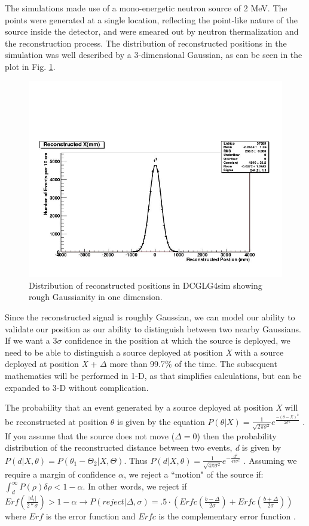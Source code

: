 The simulations made use of a mono-energetic neutron source of 2 MeV. The points were generated at a single location, reflecting the point-like nature of the source inside the detector, and were smeared out by neutron thermalization and the reconstruction process. The distribution of reconstructed positions in the simulation was well described by a 3-dimensional Gaussian, as can be seen in the plot in Fig. \ref{Sim Reco}.

\begin{figure}
\includegraphics[width=\textwidth]{AA/AA_Reconstructed_Positions.jpg}
\caption{Distribution of reconstructed positions in DCGLG4sim showing rough Gaussianity in one dimension.}
\label{Sim Reco}
\end{figure}

Since the reconstructed signal is roughly Gaussian, we can model our ability to validate our position as our ability to distinguish between two nearby Gaussians. If we want a 3$\sigma$ confidence in the position at which the source is deployed, we need to be able to distinguish a source deployed at position \emph{X} with a source deployed at position \emph{X} + $\Delta$ more than 99.7\% of the time. The subsequent mathematics will be performed in 1-D, as that simplifies calculations, but can be expanded to 3-D without complication. 

The probability that an event generated by a source deployed at position \emph{X} will be reconstructed at position $\theta$ is given by the equation $P(\theta | X) =\frac{1}{\sqrt{2 \pi \sigma^2}}e^{\frac{-(\theta - X)^2}{2 \sigma^2}}$ . If you assume that the source does not move ($\Delta =0$) then the probability distribution of the reconstructed distance between two events, \emph{d} is given by $P(d | X, \theta) = P(\theta_1 - \Theta_2 | X, \Theta)$. Thus $P(d | X, \theta) = \frac{1}{\sqrt{4 \pi \sigma^2}}e^{- \frac{d^2}{4 \pi \sigma^2}}$ . Assuming we require a margin of confidence $\alpha$, we reject a ``motion" of the source if: $\int_d^{\infty} P(\rho) \delta \rho <1- \alpha$. In other words, we reject if $Erf(\frac{|d_i|}{2*\sigma} )> 1- \alpha \rightarrow P(reject | \Delta, \sigma) = .5 \cdot (Erfc(\frac{b-\Delta}{2 \sigma}) + Erfc(\frac{b+\Delta}{2 \sigma}))$  where $Erf$ is the error function and $Erfc$ is the complementary error function \cite{Sam}.

